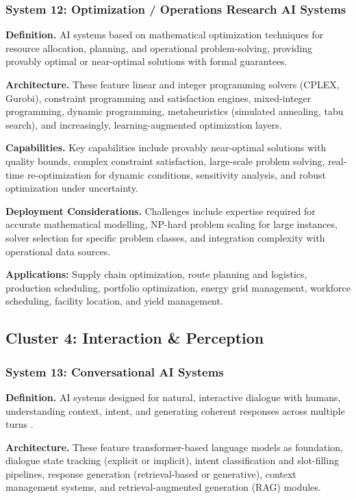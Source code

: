 \documentclass[12pt, a4paper]{article}
\begin{document}
\subsubsection{System 12: Optimization / Operations Research AI Systems}
\textbf{Definition.} AI systems based on mathematical optimization techniques for resource allocation, planning, and operational problem-solving, providing provably optimal or near-optimal solutions with formal guarantees.

\textbf{Architecture.} These feature linear and integer programming solvers (CPLEX, Gurobi), constraint programming and satisfaction engines, mixed-integer programming, dynamic programming, metaheuristics (simulated annealing, tabu search), and increasingly, learning-augmented optimization layers.

\textbf{Capabilities.} Key capabilities include provably near-optimal solutions with quality bounds, complex constraint satisfaction, large-scale problem solving, real-time re-optimization for dynamic conditions, sensitivity analysis, and robust optimization under uncertainty.

\textbf{Deployment Considerations.} Challenges include expertise required for accurate mathematical modelling, NP-hard problem scaling for large instances, solver selection for specific problem classes, and integration complexity with operational data sources.

\textbf{Applications:} Supply chain optimization, route planning and logistics, production scheduling, portfolio optimization, energy grid management, workforce scheduling, facility location, and yield management.

\subsection{Cluster 4: Interaction \& Perception}

\subsubsection{System 13: Conversational AI Systems}
\textbf{Definition.} AI systems designed for natural, interactive dialogue with humans, understanding context, intent, and generating coherent responses across multiple turns \cite{vaswani2017attention}.

\textbf{Architecture.} These feature transformer-based language models as foundation, dialogue state tracking (explicit or implicit), intent classification and slot-filling pipelines, response generation (retrieval-based or generative), context management systems, and retrieval-augmented generation (RAG) modules.
\end{document}
